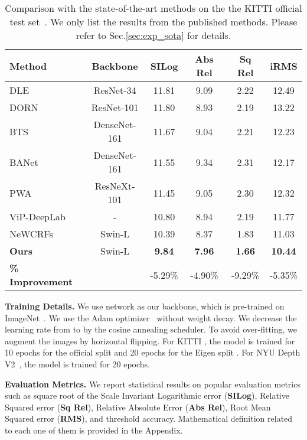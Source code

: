\documentclass{article} \usepackage{iclr2023_conference, times}
\newcommand{\formattedparagraph}[1]{\noindent \textbf{#1}}
\begin{document}
\begin{table}
\begin{center}
\scriptsize
\caption{\small Comparison with the state-of-the-art methods on the the KITTI official test set~\citep{geiger2012we}. We only list the results from the published methods. Please refer to Sec.\ref{sec:exp_sota} for details. }
\label{tab:kitti_off_sota}
\begin{tabular*}{1.0\textwidth}{l@{\extracolsep{\fill}}ccccc}
\hline
Method & Backbone & SILog & Abs Rel & Sq Rel & iRMS\\
\hline
DLE~\citep{liu2021deep} & ResNet-34 & 11.81 &   9.09 &  2.22 & 12.49\\
DORN~\citep{fu2018deep} &ResNet-101  & 11.80 &  8.93  &  2.19 & 13.22 \\
BTS~\citep{lee2019big} & DenseNet-161&  11.67 & 9.04 &  2.21 & 12.23 \\
BANet~\citep{aich2021bidirectional} & DenseNet-161 &  11.55 &  9.34 &  2.31 & 12.17 \\
PWA~\citep{lee2021patch} & ResNeXt-101 &  11.45 &   9.05 &  2.30 & 12.32 \\
ViP-DeepLab~\citep{qiao2021vip} &- & 10.80 &   8.94 &  2.19 & 11.77 \\
NeWCRFs~\citep{yuan2022new} & Swin-L & 10.39 & 8.37 & 1.83 & 11.03 \\
\hline
\textbf{Ours} & Swin-L &\textbf{9.84} &  \textbf{7.96} &  \textbf{1.66} & \textbf{10.44} \\
\textbf{\% Improvement} &  & \textcolor{ao}{{-5.29\%}} &  \textcolor{ao}{{-4.90\%}} &  \textcolor{ao}{{-9.29\%}} & \textcolor{ao}{{-5.35\%}} \\
\hline
\end{tabular*}
\end{center}
\end{table}

\formattedparagraph{Training Details.} We use \citep{liu2021swin} network as our backbone, which is pre-trained on ImageNet~\citep{deng2009imagenet}.
We use the Adam optimizer~\citep{kingma2014adam} without weight decay. 
We decrease the learning rate from  to  by the cosine annealing scheduler. To avoid over-fitting, we augment the images by horizontal flipping. For KITTI \citep{geiger2012we}, the model is trained for 10 epochs for the official split and 20 epochs for the Eigen split \citep{eigen2014depth}. For NYU Depth V2~\citep{silberman2012indoor}, the model is trained for 20 epochs.

\formattedparagraph{Evaluation Metrics.} We report statistical results on popular evaluation metrics such as square root of the Scale Invariant Logarithmic error (\textbf{SILog}), Relative Squared error (\textbf{Sq Rel}), Relative Absolute Error (\textbf{Abs Rel}), Root Mean Squared error (\textbf{RMS}), and threshold accuracy. Mathematical definition related to each one of them is provided in the Appendix.
\end{document}
